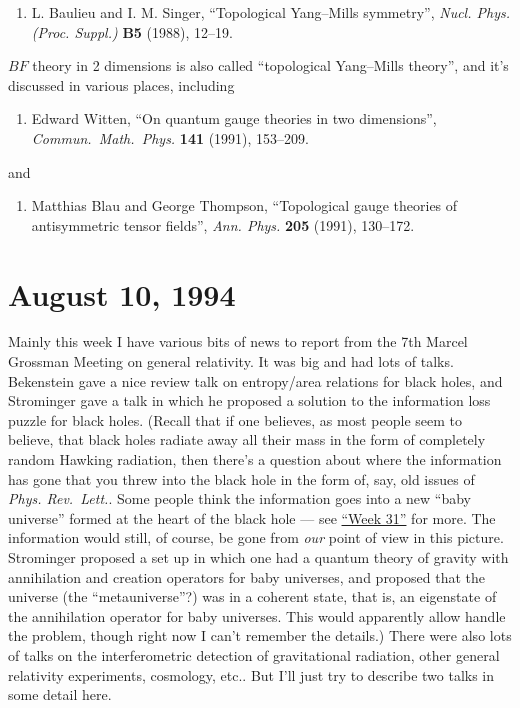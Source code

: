 \documentclass{article}
\def\tightlist{}
\begin{document}
\begin{enumerate}
\def\labelenumi{\arabic{enumi})}
\setcounter{enumi}{3}
\tightlist
\item
  L. Baulieu and I. M. Singer, ``Topological Yang--Mills symmetry'',
  \emph{Nucl. Phys. (Proc. Suppl.)} \textbf{B5} (1988), 12--19.
\end{enumerate}
\noindent
\(BF\) theory in 2 dimensions is also called ``topological Yang--Mills
theory'', and it's discussed in various places, including

\begin{enumerate}
\def\labelenumi{\arabic{enumi})}
\setcounter{enumi}{4}
\tightlist
\item
   Edward Witten, ``On quantum gauge theories in two dimensions'',
  \emph{Commun.\ Math.\ Phys.} \textbf{141} (1991), 153--209.
\end{enumerate}
\noindent
and

\begin{enumerate}
\def\labelenumi{\arabic{enumi})}
\setcounter{enumi}{5}
\tightlist
\item
 Matthias Blau and George Thompson,  ``Topological gauge theories of antisymmetric tensor fields'', \emph{Ann. Phys.} \textbf{205} (1991), 130--172.
\end{enumerate}



\hypertarget{week37}{%
\section{August 10, 1994}\label{week37}}

Mainly this week I have various bits of news to report from the 7th
Marcel Grossman Meeting on general relativity. It was big and had lots
of talks. Bekenstein gave a nice review talk on entropy/area relations
for black holes, and Strominger gave a talk in which he proposed a
solution to the information loss puzzle for black holes. (Recall that if
one believes, as most people seem to believe, that black holes radiate
away all their mass in the form of completely random Hawking radiation,
then there's a question about where the information has gone that you
threw into the black hole in the form of, say, old issues of \emph{Phys.
Rev.~Lett.}. Some people think the information goes into a new ``baby
universe'' formed at the heart of the black hole --- see
\protect\hyperlink{week31}{``Week 31''} for more. The information would
still, of course, be gone from \emph{our} point of view in this picture.
Strominger proposed a set up in which one had a quantum theory of
gravity with annihilation and creation operators for baby universes, and
proposed that the universe (the ``metauniverse''?) was in a coherent
state, that is, an eigenstate of the annihilation operator for baby
universes. This would apparently allow handle the problem, though right
now I can't remember the details.) There were also lots of talks on the
interferometric detection of gravitational radiation, other general
relativity experiments, cosmology, etc.. But I'll just try to describe
two talks in some detail here.
\end{document}
